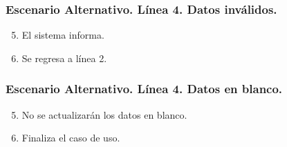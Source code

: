 \subsubsection{Escenario Alternativo. L\'{i}nea 4. Datos inv\'{a}lidos.}
\begin{enumerate}
\setcounter{enumi}{4}
\item El sistema informa.
\item Se regresa a l\'{i}nea 2.
\end{enumerate}
\subsubsection{Escenario Alternativo. L\'{i}nea 4. Datos en blanco.}
\begin{enumerate}
\setcounter{enumi}{4}
\item No se actualizar\'{a}n los datos en blanco.
\item Finaliza el caso de uso.
\end{enumerate}